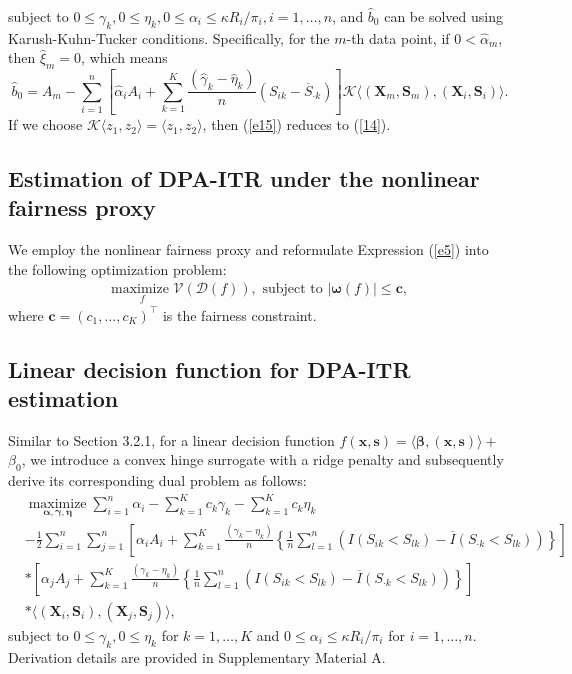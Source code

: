 \documentclass[12pt]{article}
\theoremstyle{plain}
\theoremstyle{definition}
\theoremstyle{remark}
\begin{document}
subject to $0\leq \gamma_k, 0\leq\eta_k, 0\leq \alpha_i \leq \kappa R_i / \pi_i, i=1, \ldots, n$, and $\widehat{b}_0$ can be solved using Karush-Kuhn-Tucker conditions. Specifically, for the $m$-th data point, if $0<\widehat{\alpha}_m$, then $\widehat{\xi}_m=0$, which means
{$$\widehat{b}_0= A_m-\sum_{i=1}^n\left[\widehat{\alpha}_i A_i +\sum_{k=1}^K\frac{(\widehat{\gamma}_k-\widehat{\eta}_k)}{n}\left({S}_{ik}-\overline{S}_{\cdot k}\right)\right]  \mathcal{K}\langle (\boldsymbol{X}_m, \boldsymbol{S}_m), (\boldsymbol{X}_i,\boldsymbol{S}_i)\rangle.$$}
If we choose $\mathcal{K}\langle z_1,z_2 \rangle =\langle z_1,z_2 \rangle$, then (\ref{e15}) reduces to (\ref{14}).


\subsection{Estimation of DPA-ITR under the nonlinear fairness proxy}

We employ the nonlinear fairness proxy and reformulate Expression (\ref{e5}) into the following optimization problem:
\begin{equation}
\begin{aligned}
\underset{f}{ \text{maximize }}\mathcal{V}(\mathcal{D}(f)),
 \text { subject to } |\boldsymbol{{\omega}}(f)| \leq \boldsymbol{c},
 \nonumber
\end{aligned}
\end{equation}
where $\boldsymbol{c}=(c_1,\ldots,c_K)^\top$ is the fairness constraint.

\subsection{Linear decision function for DPA-ITR estimation}
Similar to Section 3.2.1, for a linear decision function $f(\boldsymbol{x},\boldsymbol{s})=\langle\boldsymbol{\beta}, (\boldsymbol{x},\boldsymbol{s})\rangle+$ ${\beta}_0$, we introduce a convex hinge surrogate with a ridge penalty and subsequently derive its corresponding dual problem as follows:
\begin{equation}
\label{e16}
\begin{aligned}
&\underset{\boldsymbol{\alpha},  \boldsymbol{\gamma},  \boldsymbol{\eta}}{\operatorname{maximize}}
\sum_{i=1}^n \alpha_i
-\sum_{k=1}^Kc_k\gamma_k
-\sum_{k=1}^Kc_k\eta_k\\
&-\frac{1}{2}\sum_{i=1}^n\sum_{j=1}^n\left[\alpha_i A_i +\sum_{k=1}^K\frac{(\gamma_k-\eta_k)}{n}\left\{\frac{1}{n}\sum_{l=1}^n\left(I({S}_{ik}<S_{lk})-\overline{{I}}({S}_{\cdot k}<S_{lk})\right)\right\}\right]\\
&*\left[\alpha_j A_j +\sum_{k=1}^K\frac{(\gamma_k-\eta_k)}{n}\left\{\frac{1}{n}\sum_{l=1}^n\left(I({S}_{ik}<S_{lk})-\overline{{I}}({S}_{\cdot k}<S_{lk})\right)\right\}\right]\\
&* \langle(\boldsymbol{X}_i,\boldsymbol{S}_i),(\boldsymbol{X}_j,\boldsymbol{S}_j) \rangle,
\end{aligned}
\end{equation}
subject to $0\leq \gamma_k, 0\leq\eta_k$ for $ k=1,\ldots, K$ and $0\leq \alpha_i \leq \kappa R_i / \pi_i$ for $ i=1, \ldots, n$. Derivation details are provided in Supplementary Material A.
\end{document}
